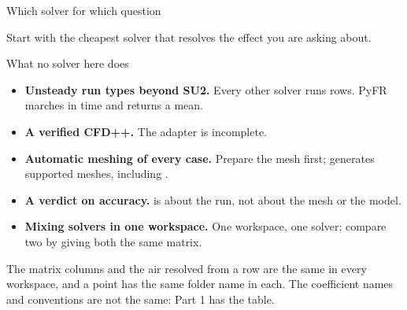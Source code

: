 \begin{frame}{Which solver for which question}
\begin{takeaway}Start with the cheapest solver that resolves the effect you
are asking about.\end{takeaway}
\end{frame}

\begin{frame}{What no solver here does}
\begin{itemize}
  \item \textbf{Unsteady run types beyond SU2.} Every other solver runs
         rows. PyFR marches in time and returns a mean.
  \item \textbf{A verified CFD++.} The adapter is incomplete.
  \item \textbf{Automatic meshing of every case.} Prepare the mesh first;
         generates supported meshes, including .
  \item \textbf{A verdict on accuracy.}  is about the run,
        not about the mesh or the model.
  \item \textbf{Mixing solvers in one workspace.} One workspace, one solver;
        compare two by giving both the same matrix.
\end{itemize}
\begin{cfdbevidence}
The matrix columns and the air resolved from a row are the same in every
workspace, and a point has the same folder name in each. The coefficient
names and conventions are not the same: Part 1 has the table.
\end{cfdbevidence}
\end{frame}
